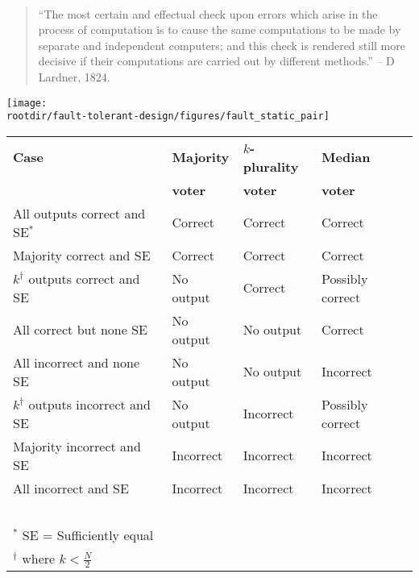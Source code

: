 \documentclass[11pt]{article}
\def\rootdir{../}
\begin{document}
\pagebreak

~

~

~

~

~

~

\begin{quote}
``The most certain and effectual check upon errors which arise in the process of computation is to cause the same computations to be made by separate and independent computers; and this check is rendered still more decisive if their computations are carried out by different methods.'' -- D Lardner, 1824.
\end{quote}

\vfill

\begin{center}
 \texttt{[image: \\rootdir/fault-tolerant-design/figures/fault\_static\_pair]}
\end{center}

\vfill

\pagebreak

\begin{center}
\begin{tabular}{llll}
\toprule
{\bf Case} & {\bf Majority} & {\bf \(k\)-plurality} &
             {\bf Median}\\
  & {\bf voter} & {\bf voter} &{\bf voter}\\
\midrule
All outputs correct and SE\(^*\) & Correct & Correct & Correct\\
Majority correct and SE & Correct & Correct & Correct\\
\(k^{\dagger}\) outputs correct and SE 
         & No output & Correct & Possibly correct\\[3mm]
All correct but none SE & No output & No output & Correct\\
All incorrect and none SE & No output & No output & Incorrect\\
\(k^{\dagger}\) outputs incorrect and SE & No output & Incorrect & Possibly correct\\[3mm]
Majority incorrect and SE & Incorrect & Incorrect & Incorrect\\
All incorrect and SE & Incorrect & Incorrect & Incorrect\\
\bottomrule
~\\
\(^*\) SE = Sufficiently equal\\
\(^{\dagger}\) where \(k < \frac{N}{2}\)
\end{tabular}
\end{center}
\end{document}
